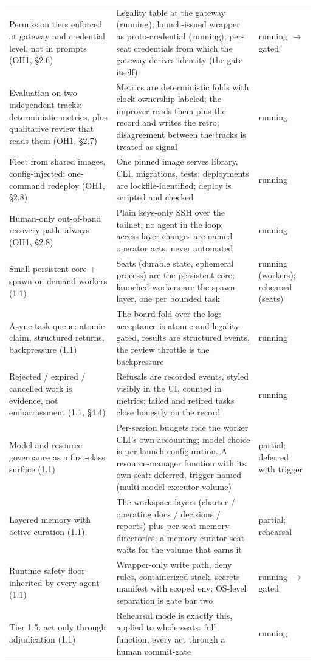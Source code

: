 \begin{longtable}{@{}L{37mm}L{57mm}L{20mm}@{}}
Permission tiers enforced at gateway and credential level, not in prompts (OH1, \S2.6) & Legality table at the gateway (running); launch-issued wrapper as proto-credential (running); per-seat credentials from which the gateway derives identity (the gate itself) & running $\to$ gated \\
Evaluation on two independent tracks: deterministic metrics, plus qualitative review that reads them (OH1, \S2.7) & Metrics are deterministic folds with clock ownership labeled; the improver reads them plus the record and writes the retro; disagreement between the tracks is treated as signal & running \\
Fleet from shared images, config-injected; one-command redeploy (OH1, \S2.8) & One pinned image serves library, CLI, migrations, tests; deployments are lockfile-identified; deploy is scripted and checked & running \\
Human-only out-of-band recovery path, always (OH1, \S2.8) & Plain keys-only SSH over the tailnet, no agent in the loop; access-layer changes are named operator acts, never automated & running \\
Small persistent core + spawn-on-demand workers (1.1) & Seats (durable state, ephemeral process) are the persistent core; launched workers are the spawn layer, one per bounded task & running (workers); rehearsal (seats) \\
Async task queue: atomic claim, structured returns, backpressure (1.1) & The board fold over the log: acceptance is atomic and legality-gated, results are structured events, the review throttle is the backpressure & running \\
Rejected / expired / cancelled work is evidence, not embarrassment (1.1, \S4.4) & Refusals are recorded events, styled visibly in the UI, counted in metrics; failed and retired tasks close honestly on the record & running \\
Model and resource governance as a first-class surface (1.1) & Per-session budgets ride the worker CLI's own accounting; model choice is per-launch configuration. A resource-manager function with its own seat: deferred, trigger named (multi-model executor volume) & partial; deferred with trigger \\
Layered memory with active curation (1.1) & The workspace layers (charter / operating docs / decisions / reports) plus per-seat memory directories; a memory-curator seat waits for the volume that earns it & partial; rehearsal \\
Runtime safety floor inherited by every agent (1.1) & Wrapper-only write path, deny rules, containerized stack, secrets manifest with scoped env; OS-level separation is gate bar two & running $\to$ gated \\
Tier 1.5: act only through adjudication (1.1) & Rehearsal mode is exactly this, applied to whole seats: full function, every act through a human commit-gate & running \\
\bottomrule
\end{longtable}
\normalsize

